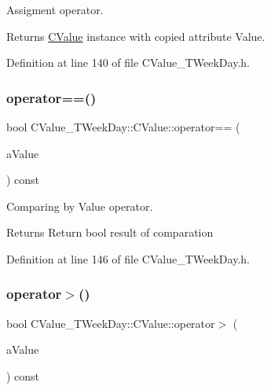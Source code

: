 Assigment operator. 

\begin{DoxyReturn}{Returns}
\hyperlink{class_c_value___t_week_day_1_1_c_value}{C\+Value} instance with copied attribute Value. 
\end{DoxyReturn}


Definition at line 140 of file C\+Value\+\_\+\+T\+Week\+Day.\+h.

\mbox{\label{class_c_value___t_week_day_1_1_c_value_a24d761dc0cf9194eeff9750c92a8c6c5}} 
\subsubsection{\texorpdfstring{operator==()}{operator==()}}
{\footnotesize\ttfamily bool C\+Value\+\_\+\+T\+Week\+Day\+::\+C\+Value\+::operator== (\begin{DoxyParamCaption}\item[{const \hyperlink{class_c_value___t_week_day_1_1_c_value}{C\+Value} \&}]{a\+Value }\end{DoxyParamCaption}) const\hspace{0.3cm}{\ttfamily [inline]}}



Comparing by Value operator. 

\begin{DoxyReturn}{Returns}
Return {\ttfamily bool} result of comparation 
\end{DoxyReturn}


Definition at line 146 of file C\+Value\+\_\+\+T\+Week\+Day.\+h.

\mbox{\label{class_c_value___t_week_day_1_1_c_value_ae5deb329e36bc2f814b39ca397199211}} 
\subsubsection{\texorpdfstring{operator$>$()}{operator>()}}
{\footnotesize\ttfamily bool C\+Value\+\_\+\+T\+Week\+Day\+::\+C\+Value\+::operator$>$ (\begin{DoxyParamCaption}\item[{const \hyperlink{class_c_value___t_week_day_1_1_c_value}{C\+Value} \&}]{a\+Value }\end{DoxyParamCaption}) const\hspace{0.3cm}{\ttfamily [inline]}}



